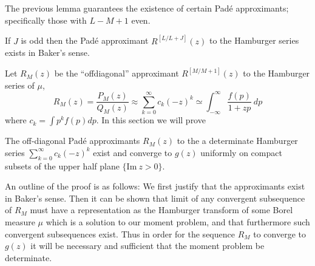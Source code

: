 The previous lemma guarantees the existence of certain Pad\'e approximants; specifically those with $L-M+1$ even. 
\begin{theorem}
  If $J$ is odd then the Pad\'e approximant $R^{[L/L+J]}(z)$ to the Hamburger series exists in Baker's sense.
\end{theorem}


Let $R_M(z)$ be the ``offdiagonal'' approximant $R^{[M/M+1]}(z)$ to the Hamburger series of $\mu$,
\[
  R_M(z) = \frac{P_M(z)}{Q_M(z)} \approx \sum_{k=0}^\infty c_k {(-z)}^k \simeq \int_{-\infty}^\infty \frac{f(p)}{1 + zp} ~dp
\]
where $c_k = \int p^k f(p) dp$. In this section we will prove

\begin{theorem}
  The off-diagonal Pad\'e approximants $R_M(z)$ to the a determinate Hamburger series $\sum_{k=0}^\infty c_k {(-z)}^k$ exist and converge to $g(z)$ uniformly on compact subsets of the upper half plane $\{\text{Im} ~z > 0\}$.
\end{theorem}

An outline of the proof is as follows: We first justify that the approximants exist in Baker's sense. Then it can be shown that limit of any convergent subsequence of $R_M$ must have a representation as the Hamburger transform of some Borel measure $\mu$ which is a solution to our moment problem, and that furthermore such convergent subsequences exist. Thus in order for the sequence $R_M$ to converge to $g(z)$ it will be necessary and sufficient that the moment problem be determinate.


